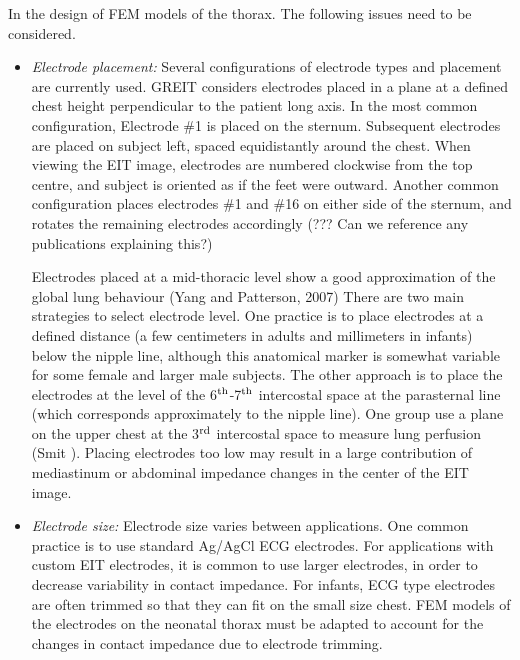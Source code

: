 \documentclass[12pt]{iopart}
\begin{document}
In the design of FEM models of the thorax. The
following issues need to be considered.
\begin{itemize}
\item
{\em Electrode placement:}
Several configurations of electrode types and placement
are currently used. GREIT considers electrodes placed
in a plane at a defined chest height perpendicular to 
the patient long axis. In the most common configuration,
Electrode \#1 is placed on the sternum. Subsequent
electrodes are placed on subject left, spaced equidistantly
around the chest. When viewing the EIT image, electrodes
are numbered clockwise from the top centre, and subject
is oriented as if the feet were outward. Another
common configuration places electrodes \#1 and \#16 on
either side of the sternum, and rotates the remaining 
electrodes accordingly (??? Can we reference any 
publications explaining this?)

Electrodes placed at a mid-thoracic level show a 
good approximation of the global lung behaviour
(Yang and Patterson, 2007)
There are two main strategies to select electrode
level.  One practice is to place
electrodes at a defined distance (a few centimeters 
in adults and millimeters in infants)
below the nipple line, although this anatomical
marker is somewhat variable for some female and
larger male subjects. 
The other approach is to 
place the electrodes at the level of the
6$^{\rm th}$-7$^{\rm th}$ intercostal space at
the parasternal line (which corresponds approximately
to the nipple line). One group use a plane on
the upper chest at the 3$^{\rm rd}$ intercostal space
to measure lung perfusion (Smit ).
Placing electrodes too low may result in a large
contribution of mediastinum or abdominal impedance
changes in the center of the EIT image.

\item
{\em Electrode size:}
Electrode size varies between applications. One common
practice is to use standard Ag/AgCl ECG electrodes.
For applications with custom EIT electrodes, it is
common to use larger electrodes, in order to decrease
variability in contact impedance. For infants, 
ECG type electrodes are often trimmed so that they
can fit on the small size chest. FEM models of
the electrodes on the neonatal thorax must be adapted
to account for the changes in contact impedance
due to electrode trimming.


\end{itemize}
\end{document}
